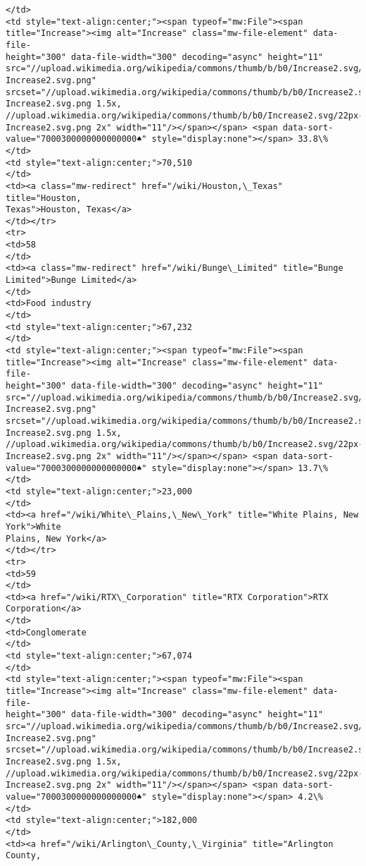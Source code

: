 \documentclass[11pt]{article}
\begin{document}
\begin{Verbatim}[commandchars=\\\{\}]
</td>
<td style="text-align:center;"><span typeof="mw:File"><span
title="Increase"><img alt="Increase" class="mw-file-element" data-file-
height="300" data-file-width="300" decoding="async" height="11"
src="//upload.wikimedia.org/wikipedia/commons/thumb/b/b0/Increase2.svg/11px-
Increase2.svg.png"
srcset="//upload.wikimedia.org/wikipedia/commons/thumb/b/b0/Increase2.svg/17px-
Increase2.svg.png 1.5x,
//upload.wikimedia.org/wikipedia/commons/thumb/b/b0/Increase2.svg/22px-
Increase2.svg.png 2x" width="11"/></span></span> <span data-sort-
value="7000300000000000000♠" style="display:none"></span> 33.8\%
</td>
<td style="text-align:center;">70,510
</td>
<td><a class="mw-redirect" href="/wiki/Houston,\_Texas" title="Houston,
Texas">Houston, Texas</a>
</td></tr>
<tr>
<td>58
</td>
<td><a class="mw-redirect" href="/wiki/Bunge\_Limited" title="Bunge
Limited">Bunge Limited</a>
</td>
<td>Food industry
</td>
<td style="text-align:center;">67,232
</td>
<td style="text-align:center;"><span typeof="mw:File"><span
title="Increase"><img alt="Increase" class="mw-file-element" data-file-
height="300" data-file-width="300" decoding="async" height="11"
src="//upload.wikimedia.org/wikipedia/commons/thumb/b/b0/Increase2.svg/11px-
Increase2.svg.png"
srcset="//upload.wikimedia.org/wikipedia/commons/thumb/b/b0/Increase2.svg/17px-
Increase2.svg.png 1.5x,
//upload.wikimedia.org/wikipedia/commons/thumb/b/b0/Increase2.svg/22px-
Increase2.svg.png 2x" width="11"/></span></span> <span data-sort-
value="7000300000000000000♠" style="display:none"></span> 13.7\%
</td>
<td style="text-align:center;">23,000
</td>
<td><a href="/wiki/White\_Plains,\_New\_York" title="White Plains, New York">White
Plains, New York</a>
</td></tr>
<tr>
<td>59
</td>
<td><a href="/wiki/RTX\_Corporation" title="RTX Corporation">RTX Corporation</a>
</td>
<td>Conglomerate
</td>
<td style="text-align:center;">67,074
</td>
<td style="text-align:center;"><span typeof="mw:File"><span
title="Increase"><img alt="Increase" class="mw-file-element" data-file-
height="300" data-file-width="300" decoding="async" height="11"
src="//upload.wikimedia.org/wikipedia/commons/thumb/b/b0/Increase2.svg/11px-
Increase2.svg.png"
srcset="//upload.wikimedia.org/wikipedia/commons/thumb/b/b0/Increase2.svg/17px-
Increase2.svg.png 1.5x,
//upload.wikimedia.org/wikipedia/commons/thumb/b/b0/Increase2.svg/22px-
Increase2.svg.png 2x" width="11"/></span></span> <span data-sort-
value="7000300000000000000♠" style="display:none"></span> 4.2\%
</td>
<td style="text-align:center;">182,000
</td>
<td><a href="/wiki/Arlington\_County,\_Virginia" title="Arlington County,

\end{Verbatim}
\end{document}
